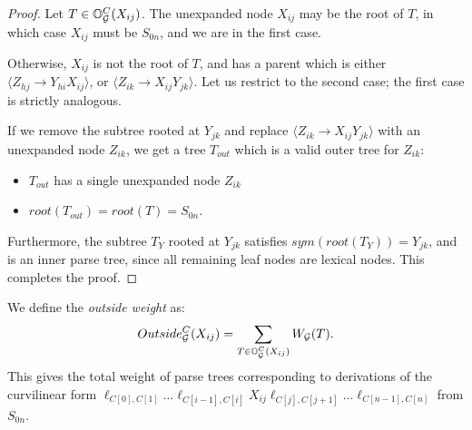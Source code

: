 \begin{proof}
  Let $T\in \mathbb{O}_{{\mathcal G}}^C(X_{ij})$. The unexpanded
  node $X_{ij}$ may be the root of $T$, in which case $X_{ij}$ must be
  $S_{0n}$, and we are in the first case.

  Otherwise, $X_{ij}$ is not the root of $T$, and has a parent which
  is either $\langle Z_{hj} \to Y_{hi} X_{ij} \rangle$, or $\langle
  Z_{ik} \to X_{ij} Y_{jk} \rangle$. Let us restrict to the second
  case; the first case is strictly analogous. 
  
  If we remove the subtree rooted at $Y_{jk}$ and replace $\langle
  Z_{ik} \to X_{ij} Y_{jk} \rangle$ with an unexpanded node $Z_{ik}$, we get a
  tree $T_{out}$ which is a valid outer tree for $Z_{ik}$:
  \begin{itemize}
  \item $T_{out}$ has a single unexpanded node $Z_{ik}$
  \item $root(T_{out}) = root(T) = S_{0n}$.
  \end{itemize}
  Furthermore, the subtree $T_Y$ rooted at $Y_{jk}$ satisfies
  $sym(root(T_Y)) = Y_{jk}$, and is an inner parse tree, since all
  remaining leaf nodes are lexical nodes. This completes the proof.
  
\end{proof}

We define the \emph{outside weight} as:
$$Outside_{{\mathcal G}}^C(X_{ij}) = \sum_{T\in \mathbb{O}_{{\mathcal G}}^C(X_{ij})}
W_{{\mathcal G}}(T).$$ This gives the total weight of parse trees corresponding
to derivations of the curvilinear form $\ell_{C[0], C[1]}\dots
\ell_{C[i-1],C[i]} X_{ij} \ell_{C[j], C[j+1]} \dots \ell_{C[n-1],
  C[n]}$ from $S_{0n}$.

